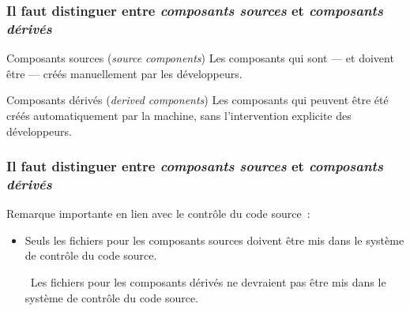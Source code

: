 \begin{frame}
\frametitle{Il faut distinguer entre \emph{composants sources} et
\emph{composants d\'eriv\'es}}

\begin{block}{Composants sources (\emph{source components})}
Les composants qui sont --- et doivent \^etre --- cr\'e\'es
\alert{manuellement} par les d\'eveloppeurs.
\end{block}


\bigskip


\VF

\begin{block}{Composants d\'eriv\'es (\emph{derived components})}
Les composants qui peuvent \^etre \'et\'e cr\'e\'es \alert{automatiquement} par
la machine, sans l'intervention explicite des d\'eveloppeurs.

\end{block}

\bigskip

 

\VF

\NOTE{\ }

\end{frame}

\begin{frame}
\frametitle{Il faut distinguer entre \emph{composants sources} et
\emph{composants d\'eriv\'es}}

\alert{Remarque importante en lien avec le contr\^ole du
code source~:} 

\begin{itemize}
\bigskip

\item Seuls les fichiers pour les composants \alert{sources} doivent
\^etre mis dans le syst\`eme de contr\^ole du code source.

\bigskip

\Implique\ Les fichiers pour les composants d\'eriv\'es \alert{ne devraient pas
\^etre mis} dans le syst\`eme de contr\^ole du code source.  

\end{itemize}
\VF

\NOTEvide

\end{frame}


